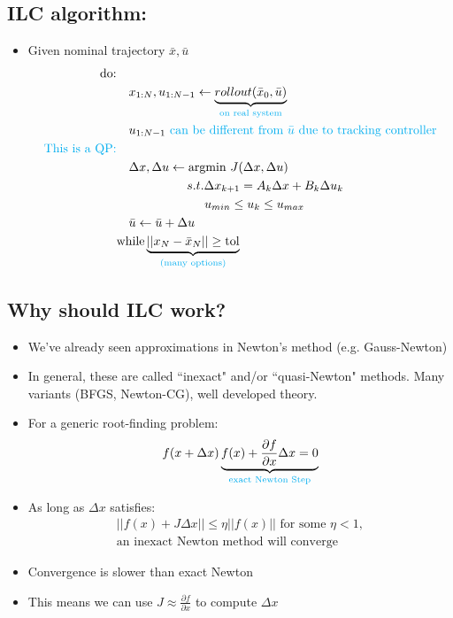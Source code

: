 \documentclass[11pt]{article}
\begin{document}
\subsection*{ILC algorithm:}
\begin{itemize}
    \item Given nominal trajectory $\bar{x},\bar{u}$
    \begin{align*}
        \text{do:} &
        \\
        & \quad x_{1:N},u_{1:N-1} \leftarrow \underbrace{rollout(\bar{x}_0,\bar{u})}_{\textcolor{cyan}{\text{on real system}}} \\
        & \quad u_{1:N-1} \textcolor{cyan}{\text{ can be different from }\bar{u} \text{ due to tracking controller}} \\
        \text{\textcolor{cyan}{This is a QP:}} \\
        & \quad\Delta x, \Delta u \leftarrow \text{argmin } J(\Delta x, \Delta u)
        \\
        & \hspace{20mm} s.t. \Delta x_{k+1} = A_k\Delta x + B_k \Delta u_k \\
        & \hspace{25mm} u_{min} \leq u_k\leq u_{max}
        \\
        & \quad \bar{u}\leftarrow \bar{u} + \Delta u
        \\
        & \text{while} \underbrace{||x_N - \bar{x}_N|| \geq \text{tol}}_{\textcolor{cyan}{\text{(many options)}}}
    \end{align*}
\end{itemize}
\subsection*{Why should ILC work?}
\begin{itemize}
    \item We've already seen approximations in Newton's method (e.g. Gauss-Newton)
    \item In general, these are called ``inexact" and/or ``quasi-Newton" methods. Many variants (BFGS, Newton-CG), well developed theory.
    \item For a generic root-finding problem:
    \begin{align*}
        f(x+\Delta x) \underbrace{f(x) + \frac{\partial f}{\partial x}\Delta x = 0}_{\textcolor{cyan}{\text{exact Newton Step}}}
    \end{align*}
    \item As long as $\Delta x$ satisfies:
    \begin{align*}
        || f(x) + J\Delta x|| \leq \eta ||f(x)|| \text{ for some } \eta <1,
        \\
        \text{an inexact Newton method will converge}
    \end{align*}
    \item Convergence is slower than exact Newton
    \item This means we can use $J\approx \frac{\partial f}{\partial x}$ to compute $\Delta x$
\end{itemize}
\end{document}
